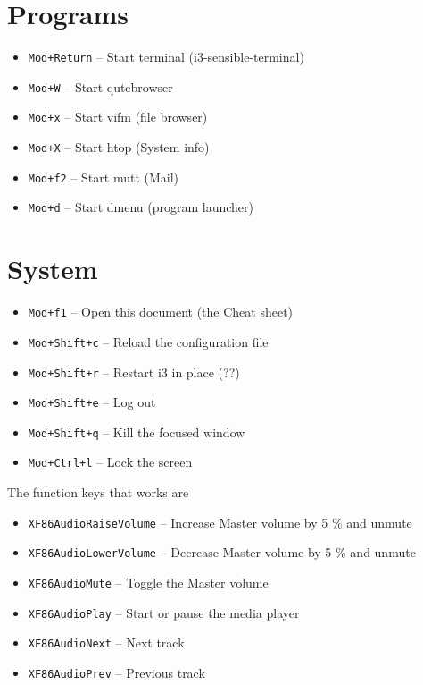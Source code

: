 \documentclass{article}
\begin{document}
\section*{Programs}
\begin{itemize}
	\item \verb|Mod+Return| -- Start terminal (i3-sensible-terminal)
	\item \verb|Mod+W| -- Start qutebrowser
	\item \verb|Mod+x| -- Start vifm (file browser)
	\item \verb|Mod+X| -- Start htop (System info)
	\item \verb|Mod+f2| -- Start mutt (Mail)
	\item \verb|Mod+d| -- Start dmenu (program launcher)
\end{itemize}

\section*{System}
\begin{itemize}
	\item \verb|Mod+f1| -- Open this document (the Cheat sheet)
	\item \verb|Mod+Shift+c| -- Reload the configuration file
	\item \verb|Mod+Shift+r| -- Restart i3 in place (??)
	\item \verb|Mod+Shift+e| -- Log out
	\item \verb|Mod+Shift+q| -- Kill the focused window
	\item \verb|Mod+Ctrl+l| -- Lock the screen
\end{itemize}

The function keys that works are 
\begin{itemize}
	\item \verb|XF86AudioRaiseVolume| -- Increase Master volume by 5 \% and unmute
	\item \verb|XF86AudioLowerVolume| -- Decrease Master volume by 5 \% and unmute
	\item \verb|XF86AudioMute| -- Toggle the Master volume
	\item \verb|XF86AudioPlay| -- Start or pause the media player 
	\item \verb|XF86AudioNext| -- Next track  
	\item \verb|XF86AudioPrev| -- Previous track  
\end{itemize}
\end{document}
